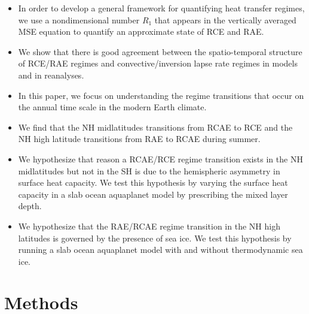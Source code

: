 \documentclass{ametsocV5}
\begin{document}
\begin{itemize}
  \item In order to develop a general framework for quantifying heat transfer regimes, we use a nondimensional number \(R_{1}\) that appears in the vertically averaged MSE equation to quantify an approximate state of RCE and RAE.
  \item We show that there is good agreement between the spatio-temporal structure of RCE/RAE regimes and convective/inversion lapse rate regimes in models and in reanalyses.
  \item In this paper, we focus on understanding the regime transitions that occur on the annual time scale in the modern Earth climate.
  \item We find that the NH midlatitudes transitions from RCAE to RCE and the NH high latitude transitions from RAE to RCAE during summer.
  \item We hypothesize that reason a RCAE/RCE regime transition exists in the NH midlatitudes but not in the SH is due to the hemispheric asymmetry in surface heat capacity. We test this hypothesis by varying the surface heat capacity in a slab ocean aquaplanet model by prescribing the mixed layer depth.
  \item We hypothesize that the RAE/RCAE regime transition in the NH high latitudes is governed by the presence of sea ice. We test this hypothesis by running a slab ocean aquaplanet model with and without thermodynamic sea ice.
\end{itemize}

\section{Methods}
\end{document}
